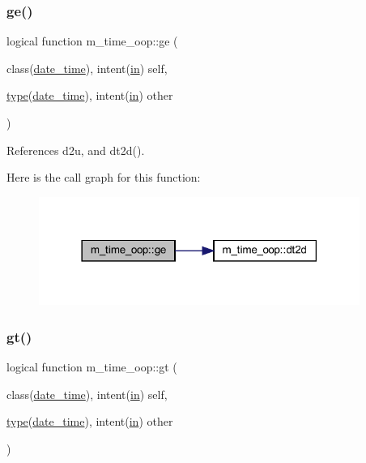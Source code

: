 \subsubsection{\texorpdfstring{ge()}{ge()}}
{\footnotesize\ttfamily logical function m\+\_\+time\+\_\+oop\+::ge (\begin{DoxyParamCaption}\item[{class(\hyperlink{structm__time__oop_1_1date__time}{date\+\_\+time}), intent(\hyperlink{M__journal_83_8txt_afce72651d1eed785a2132bee863b2f38}{in})}]{self,  }\item[{\hyperlink{stop__watch_83_8txt_a70f0ead91c32e25323c03265aa302c1c}{type}(\hyperlink{structm__time__oop_1_1date__time}{date\+\_\+time}), intent(\hyperlink{M__journal_83_8txt_afce72651d1eed785a2132bee863b2f38}{in})}]{other }\end{DoxyParamCaption})\hspace{0.3cm}{\ttfamily [private]}}



References d2u, and dt2d().

Here is the call graph for this function\+:
\nopagebreak
\begin{figure}[H]
\begin{center}
\leavevmode
\includegraphics[width=297pt]{namespacem__time__oop_aeea1131ab511b897168f00a908b75458_cgraph}
\end{center}
\end{figure}
\mbox{\label{namespacem__time__oop_a753692f18b6cd100401603d0b88d7c3c}} 
\subsubsection{\texorpdfstring{gt()}{gt()}}
{\footnotesize\ttfamily logical function m\+\_\+time\+\_\+oop\+::gt (\begin{DoxyParamCaption}\item[{class(\hyperlink{structm__time__oop_1_1date__time}{date\+\_\+time}), intent(\hyperlink{M__journal_83_8txt_afce72651d1eed785a2132bee863b2f38}{in})}]{self,  }\item[{\hyperlink{stop__watch_83_8txt_a70f0ead91c32e25323c03265aa302c1c}{type}(\hyperlink{structm__time__oop_1_1date__time}{date\+\_\+time}), intent(\hyperlink{M__journal_83_8txt_afce72651d1eed785a2132bee863b2f38}{in})}]{other }\end{DoxyParamCaption})\hspace{0.3cm}{\ttfamily [private]}}



